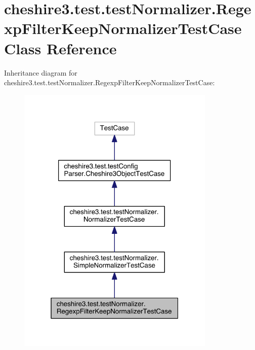 \hypertarget{classcheshire3_1_1test_1_1test_normalizer_1_1_regexp_filter_keep_normalizer_test_case}{\section{cheshire3.\-test.\-test\-Normalizer.\-Regexp\-Filter\-Keep\-Normalizer\-Test\-Case Class Reference}
\label{classcheshire3_1_1test_1_1test_normalizer_1_1_regexp_filter_keep_normalizer_test_case}
}


Inheritance diagram for cheshire3.\-test.\-test\-Normalizer.\-Regexp\-Filter\-Keep\-Normalizer\-Test\-Case\-:
\nopagebreak
\begin{figure}[H]
\begin{center}
\leavevmode
\includegraphics[width=268pt]{classcheshire3_1_1test_1_1test_normalizer_1_1_regexp_filter_keep_normalizer_test_case__inherit__graph}
\end{center}
\end{figure}


